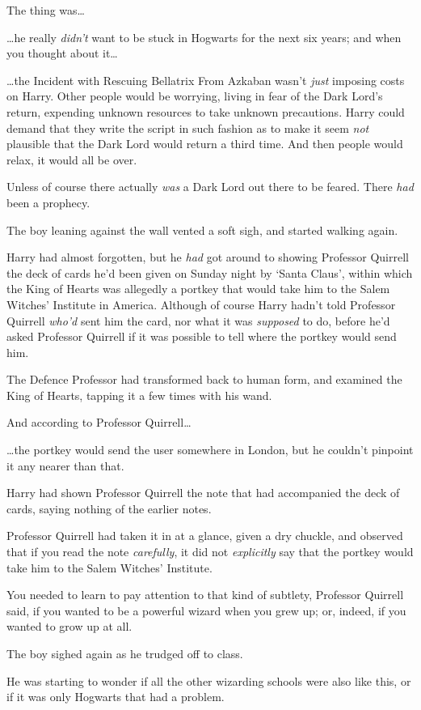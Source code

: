 The thing was…

…he really \emph{didn’t} want to be stuck in Hogwarts for the next six years; and when you thought about it…

…the Incident with Rescuing Bellatrix From Azkaban wasn’t \emph{just} imposing costs on Harry. Other people would be worrying, living in fear of the Dark Lord’s return, expending unknown resources to take unknown precautions. Harry could demand that they write the script in such fashion as to make it seem \emph{not} plausible that the Dark Lord would return a third time. And then people would relax, it would all be over.

Unless of course there actually \emph{was} a Dark Lord out there to be feared. There \emph{had} been a prophecy.

The boy leaning against the wall vented a soft sigh, and started walking again.

Harry had almost forgotten, but he \emph{had} got around to showing Professor Quirrell the deck of cards he’d been given on Sunday night by ‘Santa Claus’, within which the King of Hearts was allegedly a portkey that would take him to the Salem Witches’ Institute in America. Although of course Harry hadn’t told Professor Quirrell \emph{who’d} sent him the card, nor what it was \emph{supposed} to do, before he’d asked Professor Quirrell if it was possible to tell where the portkey would send him.

The Defence Professor had transformed back to human form, and examined the King of Hearts, tapping it a few times with his wand.

And according to Professor Quirrell…

…the portkey would send the user somewhere in London, but he couldn’t pinpoint it any nearer than that.

Harry had shown Professor Quirrell the note that had accompanied the deck of cards, saying nothing of the earlier notes.

Professor Quirrell had taken it in at a glance, given a dry chuckle, and observed that if you read the note \emph{carefully}, it did not \emph{explicitly} say that the portkey would take him to the Salem Witches’ Institute.

You needed to learn to pay attention to that kind of subtlety, Professor Quirrell said, if you wanted to be a powerful wizard when you grew up; or, indeed, if you wanted to grow up at all.

The boy sighed again as he trudged off to class.

He was starting to wonder if all the other wizarding schools were also like this, or if it was only Hogwarts that had a problem.

